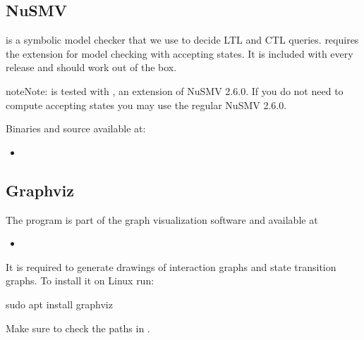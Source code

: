 \documentclass[letterpaper,10pt,english]{sphinxmanual}
\begin{document}
\subsection{NuSMV}
\label{\detokenize{Installation:nusmv}}\label{\detokenize{Installation:installation-nusmv}}
 is a symbolic model checker that we use to decide LTL and CTL queries.
 requires the extension  for model checking with accepting states.
It is included with every release and should work out of the box.

\begin{sphinxadmonition}{note}{Note:}
 is tested with , an extension of NuSMV 2.6.0. If you do not need to compute accepting states you may use the regular NuSMV 2.6.0.
\end{sphinxadmonition}

Binaries and source available at:
\begin{itemize}
\item {} 

\end{itemize}


\subsection{Graphviz}
\label{\detokenize{Installation:graphviz}}\label{\detokenize{Installation:installation-graphviz}}
The program  is part of the graph visualization software  and available at
\begin{itemize}
\item {} 

\end{itemize}

It is required to generate drawings of interaction graphs and state transition graphs.
To install it on Linux run:

\begin{sphinxVerbatim}[commandchars=\\\{\}]
\PYGZdl{} sudo apt install graphviz
\end{sphinxVerbatim}

Make sure to check the paths in .
\end{document}
